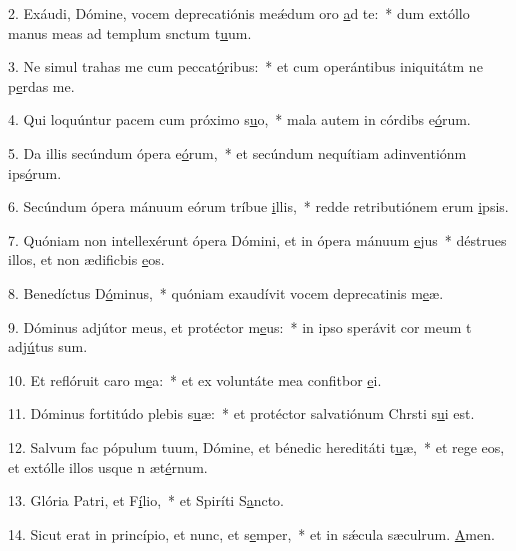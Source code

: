 2. Exáudi, Dómine, vocem deprecatiónis meǽdum oro \uline{a}d te:~* dum extóllo manus meas ad templum snctum t\uline{u}um.\par 
3. Ne simul trahas me cum peccat\uline{ó}ribus:~* et cum operántibus iniquitátm ne p\uline{e}rdas me.\par 
4. Qui loquúntur pacem cum próximo s\uline{u}o,~* mala autem in córdibs e\uline{ó}rum.\par 
5. Da illis secúndum ópera e\uline{ó}rum,~* et secúndum nequítiam adinventiónm ips\uline{ó}rum.\par 
6. Secúndum ópera mánuum eórum tríbue \uline{i}llis,~* redde retributiónem erum \uline{i}psis.\par 
7. Quóniam non intellexérunt ópera Dómini, et in ópera mánuum \uline{e}jus~* déstrues illos, et non ædificbis \uline{e}os.\par 
8. Benedíctus D\uline{ó}minus,~* quóniam exaudívit vocem deprecatinis m\uline{e}æ.\par 
9. Dóminus adjútor meus, et protéctor m\uline{e}us:~* in ipso sperávit cor meum t adj\uline{ú}tus sum.\par 
10. Et reflóruit caro m\uline{e}a:~* et ex voluntáte mea confitbor \uline{e}i.\par 
11. Dóminus fortitúdo plebis s\uline{u}æ:~* et protéctor salvatiónum Chrsti s\uline{u}i est.\par 
12. Salvum fac pópulum tuum, Dómine, et bénedic hereditáti t\uline{u}æ,~* et rege eos, et extólle illos usque n æt\uline{é}rnum.\par 
13. Glória Patri, et F\uline{í}lio,~* et Spiríti S\uline{a}ncto.\par 
14. Sicut erat in princípio, et nunc, et s\uline{e}mper,~* et in sǽcula sæculrum. \uline{A}men.\par 
